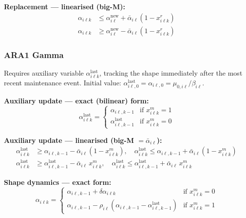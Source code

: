 \documentclass[11pt,a4paper]{article}
\begin{document}
\textbf{Replacement --- linearised (big-M):}
\begin{align}
  \alpha_{i\ell k} &\leq \alpha^{\mathrm{new}}_{i\ell}
    + \bar{\alpha}_{i\ell}(1 - x^r_{i\ell k}) \\
  \alpha_{i\ell k} &\geq \alpha^{\mathrm{new}}_{i\ell}
    - \bar{\alpha}_{i\ell}(1 - x^r_{i\ell k})
\end{align}

\subsubsection{ARA1 Gamma}

Requires auxiliary variable $\alpha^{\mathrm{last}}_{i\ell k}$, tracking the shape
immediately after the most recent maintenance event.
Initial value: $\alpha^{\mathrm{last}}_{i\ell,0} = \alpha_{i\ell,0} = \mu_{0,i\ell}/\beta_{i\ell}$.

\textbf{Auxiliary update --- exact (bilinear) form:}
\begin{equation}
  \alpha^{\mathrm{last}}_{i\ell k} = \begin{cases}
    \alpha_{i\ell,k-1} & \text{if } x^m_{i\ell k} = 1 \\
    \alpha^{\mathrm{last}}_{i\ell,k-1} & \text{if } x^m_{i\ell k} = 0
  \end{cases}
\end{equation}

\textbf{Auxiliary update --- linearised (big-M $= \bar{\alpha}_{i\ell}$):}
\begin{align}
  \alpha^{\mathrm{last}}_{i\ell k} &\geq \alpha_{i\ell,k-1}
    - \bar{\alpha}_{i\ell}(1 - x^m_{i\ell k}), \quad
  \alpha^{\mathrm{last}}_{i\ell k} \leq \alpha_{i\ell,k-1}
    + \bar{\alpha}_{i\ell}(1 - x^m_{i\ell k}) \\
  \alpha^{\mathrm{last}}_{i\ell k} &\geq \alpha^{\mathrm{last}}_{i\ell,k-1}
    - \bar{\alpha}_{i\ell}\,x^m_{i\ell k}, \quad
  \alpha^{\mathrm{last}}_{i\ell k} \leq \alpha^{\mathrm{last}}_{i\ell,k-1}
    + \bar{\alpha}_{i\ell}\,x^m_{i\ell k}
\end{align}

\textbf{Shape dynamics --- exact form:}
\begin{equation}
  \alpha_{i\ell k} = \begin{cases}
    \alpha_{i\ell,k-1} + \delta\alpha_{i\ell k} & \text{if } x^m_{i\ell k} = 0 \\
    \alpha_{i\ell,k-1} - \rho_{i\ell}(\alpha_{i\ell,k-1} - \alpha^{\mathrm{last}}_{i\ell,k-1})
      & \text{if } x^m_{i\ell k} = 1
  \end{cases}
\end{equation}
\end{document}
